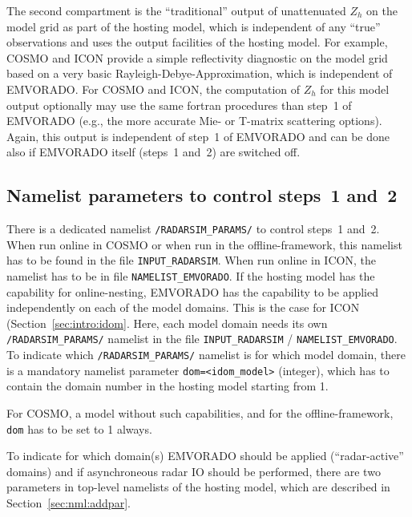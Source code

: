 \documentclass[10pt,a4paper,twoside,headinclude,footinclude,parskip=half]{scrartcl}
\newcommand{\myaktuellesection}{sec:intro}%
\newcommand{\labelsec}[1]{\label{#1}\renewcommand{\myaktuellesection}{#1}}%
\newcommand{\labelsec}[1]{\label{#1}}%
\newcommand{\srcform}[1]{\mbox{\texttt{#1}}\xspace}%
\begin{document}
The second compartment is the ``traditional'' output of unattenuated $Z_h$ on the model grid as part of the hosting model, which is
independent of any ``true'' observations and uses the output facilities of the hosting model. For example,
COSMO and ICON  provide a simple reflectivity diagnostic on the model grid based on a very basic Rayleigh-Debye-Approximation, which is
independent of EMVORADO. For COSMO and ICON, the computation of $Z_h$ for this model output optionally may use the same
fortran procedures than step~1 of EMVORADO (e.g., the more accurate Mie- or T-matrix scattering options).
Again, this output is independent of step~1 of EMVORADO and can be done also if EMVORADO
itself (steps~1 and~2) are switched off.


\subsection{Namelist parameters to control steps~1 and~2}

\labelsec{sec:nmlradarsim}

There is a dedicated namelist \srcform{/RADARSIM_PARAMS/} to control steps~1 and~2. When run online in COSMO or when run in the offline-framework, this namelist has to be found in the file
\srcform{INPUT_RADARSIM}. When run online in ICON, the namelist has to be in file \srcform{NAMELIST_EMVORADO}. If the hosting model has the capability for online-nesting, EMVORADO has the capability
to be applied independently on each of the model domains. This is the case for ICON (Section~\ref{sec:intro:idom}.
Here, each model domain needs its own \srcform{/RADARSIM_PARAMS/} namelist in the file \srcform{INPUT_RADARSIM} / \srcform{NAMELIST_EMVORADO}.
To indicate which \srcform{/RADARSIM_PARAMS/} namelist is for which model domain, there is a
mandatory namelist parameter \srcform{dom=<idom_model>} (integer), which has to contain the domain
number in the hosting model starting from 1.

For COSMO, a model without such capabilities, and for the offline-framework, \srcform{dom} has to be set to 1 always.

To indicate for which domain(s) EMVORADO should be applied (``radar-active'' domains) and if asynchroneous radar IO
should be performed, there are two parameters in top-level namelists of the hosting model, which
are described in Section~\ref{sec:nml:addpar}.
\end{document}
